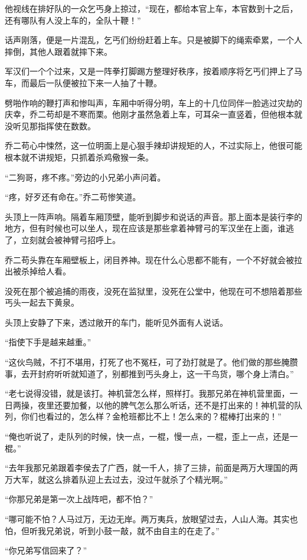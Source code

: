 他视线在排好队的一众乞丐身上掠过，“现在，都给本官上车，本官数到十之后，还有哪队有人没上车的，全队十鞭！”

话声刚落，便是一片混乱，乞丐们纷纷赶着上车。只是被脚下的绳索牵累，一个人摔倒，其他人跟着就摔下来。

军汉们一个个过来，又是一阵拳打脚踢方整理好秩序，按着顺序将乞丐们押上了马车，而最后一队便被拉下来一人抽了十鞭。

劈啪作响的鞭打声和惨叫声，车厢中听得分明，车上的十几位同伴一脸逃过灾劫的庆幸，乔二苟却是不寒而栗。他刚才虽然急着上车，可耳朵一直竖着，但他根本就没听见那指挥使在数数。

乔二苟心中悚然，这一位明面上是心狠手辣却讲规矩的人，不过实际上，他很可能根本就不讲规矩，只抓着杀鸡儆猴一条。

“二狗哥，疼不疼。”旁边的小兄弟小声问着。

“疼，好歹还有命在。”乔二苟惨笑道。

头顶上一阵声响。隔着车厢顶壁，能听到脚步和说话的声音。那上面本是装行李的地方，但有时候也可以坐人，现在应该是那些拿着神臂弓的军汉坐在上面，谁逃了，立刻就会被神臂弓招呼上。

乔二苟头靠在车厢壁板上，闭目养神。现在什么心思都不能有，一个不好就会被拉出被杀掉给人看。

没死在那个被追捕的雨夜，没死在监狱里，没死在公堂中，他现在可不想陪着那些丐头一起去下黄泉。

头顶上安静了下来，透过敞开的车门，能听见外面有人说话。

“指使下手是越来越重。”

“这伙鸟贼，不打不堪用，打死了也不冤枉，可了劲打就是了。他们做的那些腌臜事，去开封府听听就知道了，别都推到丐头身上，这一干鸟货，哪个身上清白。”

“老七说得没错，就是该打。神机营怎么样，照样打。我那兄弟在神机营里面，一日两操，夜里还要加餐，以他的脾气怎么那么听话，还不是打出来的！神机营的队列，你们也看过的，怎么样？金枪班都比不上！怎么来的？棍棒打出来的！”

“俺也听说了，走队列的时候，快一点，一棍，慢一点，一棍，歪上一点，还是一棍。”

“去年我那兄弟跟着李侯去了广西，就一千人，排了三排，前面是两万大理国的两万大军，就这么排着队迎上去过去，没过午就杀了个精光啊。”

“你那兄弟是第一次上战阵吧，都不怕？”

“哪可能不怕？人马过万，无边无岸。两万夷兵，放眼望过去，人山人海。其实也怕，但听我兄弟说，听到小鼓一敲，就不由自主的在走了。”

“你兄弟写信回来了？”

